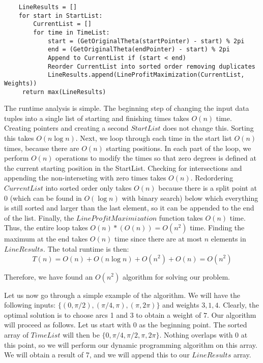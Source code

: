 \documentclass[psamsfonts]{amsart}
\newenvironment{sol}{{\bfseries Solution}}{\qedsymbol}
\theoremstyle{definition}
\theoremstyle{remark}
\numberwithin{equation}{section}
\begin{document}
\begin{sol}
\begin{verbatim}
    LineResults = []
    for start in StartList:
        CurrentList = []
        for time in TimeList:
            start = (GetOriginalTheta(startPointer) - start) % 2pi
            end = (GetOriginalTheta(endPointer) - start) % 2pi
            Append to CurrentList if (start < end) 
            Reorder CurrentList into sorted order removing duplicates
            LineResults.append(LineProfitMaximization(CurrentList, Weights))
     return max(LineResults)
\end{verbatim}

The runtime analysis is simple. The beginning step of changing the input data tuples into a single list of starting and finishing times takes $O(n)$ time. Creating pointers and creating a second $StartList$ does not change this. Sorting this takes $O(n \log n)$. Next, we loop through each time in the start list $O(n)$ times, because there are $O(n)$ starting positions. In each part of the loop, we perform $O(n)$ operations to modify the times so that zero degrees is defined at the current starting position in the StartList.  Checking for intersections and appending the non-interseting with zero times takes $O(n)$. Redordering $CurrentList$ into sorted order only takes $O(n)$ because there is a split point at $0$ (which can be found in $O(\log n)$ with binary search) below which everything is still sorted and larger than the last element, so it can be appended to the end of the list. Finally, the $LineProfitMaximization$ function takes $O(n)$ time. Thus, the entire loop takes $O(n) * (O(n)) = O(n^2)$ time. Finding the maximum at the end takes $O(n)$ time since there are at most $n$ elements in $LineResults$. The total runtime is then:
\begin{equation}
T(n) = O(n) + O(n \log n) + O(n^2) + O(n) = O(n^2)
\end{equation}

Therefore, we have found an $O(n^2)$ algorithm for solving our problem. 

Let us now go through a simple example of the algorithm. We will have the following inputs: $\{(0, \pi/2), (\pi/4, \pi), (\pi, 2 \pi)\}$ and weights $3,1,4$. Clearly, the optimal solution is to choose arcs 1 and 3 to obtain a weight of $7$. Our algorithm will proceed as follows. Let us start with 0 as the beginning point. The sorted array of $TimeList$ will then be $\{0, \pi/4, \pi/2, \pi, 2\pi \}$. Nothing overlaps with 0 at this point, so we will perform our dynamic programming algorithm on this array. We will obtain a result of 7, and we will append this to our $LineResults$ array. 


\end{sol}
\end{document}
